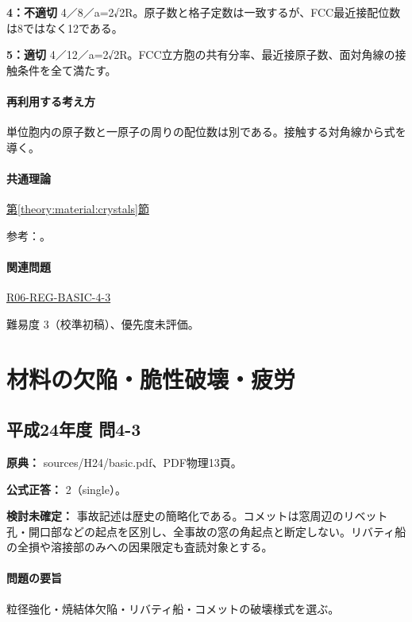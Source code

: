 \noindent\textbf{4：不適切} 4／8／a=\allowbreak{}2√2R。原子数と格子定数は一致するが、FCC最近接配位数は8ではなく12である。\par

\noindent\textbf{5：適切} 4／12／a=\allowbreak{}2√2R。FCC立方胞の共有分率、最近接原子数、面対角線の接触条件を全て満たす。\par

\paragraph{再利用する考え方} 単位胞内の原子数と一原子の周りの配位数は別である。接触する対角線から式を導く。

\paragraph{共通理論} \hyperref[theory:material:crystals]{第\ref*{theory:material:crystals}節}

\par 参考：\cite{cambridge_unitcell,openstax_crystals}。

\paragraph{関連問題} \hyperref[q:r06-reg-basic-4-3]{R06-REG-BASIC-4-3}

\par 難易度 3（校準初稿）、優先度未評価。

\section{材料の欠陥・脆性破壊・疲労}

\subsection{平成24年度 問4-3}
\label{q:h24-reg-basic-4-3}

\noindent\textbf{原典：} sources/H24/basic.pdf、PDF物理13頁。

\textbf{公式正答：} 2（single）。

\par\textbf{検討未確定：} 事故記述は歴史の簡略化である。コメットは窓周辺のリベット孔・開口部などの起点を区別し、全事故の窓の角起点と断定しない。リバティ船の全損や溶接部のみへの因果限定も査読対象とする。

\paragraph{問題の要旨} 粒径強化・焼結体欠陥・リバティ船・コメットの破壊様式を選ぶ。

